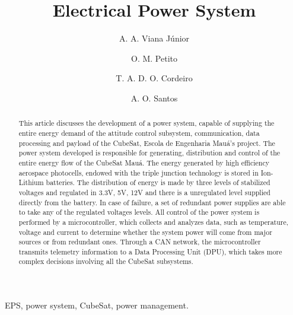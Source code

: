 \documentclass[3p]{elsarticle}
\begin{document}
\begin{frontmatter}

\title{Electrical Power System}


\author[label1,label5]{A. A. Viana J\'{u}nior}
\address[label1]{Pra\c{c}a Mau\'{a}, 1, S\~{a}o Caetano do Sul, S\~{a}o Paulo, Brasil}




\author[label1,label5]{O. M. Petito}
\address[label5]{Escola de Engenharia Mau\'{a} do Instituto Mau\'{a} de Tecnologia}

\author[label1,label5]{T. A. D. O. Cordeiro}

\author[label1,label5,label3]{A. O. Santos}


\begin{abstract}

	This article discusses the development of a power system, capable of supplying the entire energy demand of the attitude control subsystem, communication, data processing and payload of the CubeSat, Escola de Engenharia Mau\'{a}'s project. The power system developed is responsible for generating, distribution and control of the entire energy flow of the CubeSat Mau\'{a}. The energy generated by high efficiency aerospace photocells, endowed with the triple junction technology is stored in Ion-Lithium batteries. The distribution of energy is made by three levels of stabilized voltages and regulated in 3.3V, 5V, 12V and there is a unregulated level supplied directly from the battery. In case of failure, a set of redundant power supplies are able to take any of the regulated voltages levels. All control of the power system is performed by a microcontroller, which collects and analyzes data, such as temperature, voltage and current to determine whether the system power will come from major sources or from redundant ones. Through a CAN network, the microcontroller transmits telemetry information to a Data Processing Unit (DPU), which takes more complex decisions involving all the CubeSat subsystems.

\end{abstract}

\begin{keyword}
 
	EPS, power system, CubeSat, power management.

\end{keyword}

\end{frontmatter}
\end{document}
